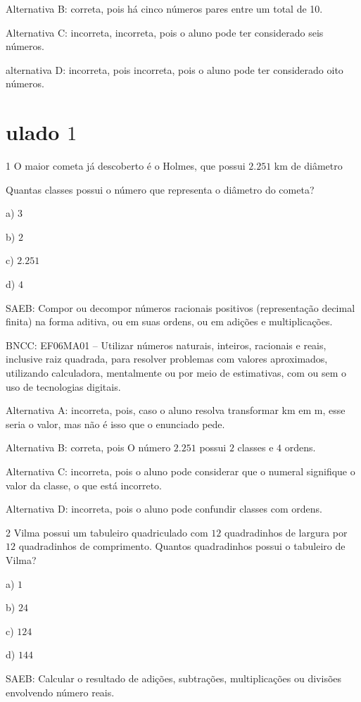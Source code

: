 Alternativa B: correta, pois há cinco números pares entre um total de
10.

Alternativa C: incorreta, incorreta, pois o aluno pode ter considerado
seis números.

alternativa D: incorreta, pois incorreta, pois o aluno pode ter
considerado oito números.

\chapter{ulado $1$}

\num{1}  O maior cometa já descoberto é o Holmes, que possui $2.251$ km de
diâmetro

Quantas classes possui o número que representa o diâmetro do cometa?

a) $3$

b) $2$

c) $2.251$

d) $4$

SAEB: Compor ou decompor números racionais positivos (representação
decimal finita) na forma aditiva, ou em suas ordens, ou em adições e
multiplicações.

BNCC: EF06MA01 -- Utilizar números naturais, inteiros, racionais e
reais, inclusive raiz quadrada, para resolver problemas com valores
aproximados, utilizando calculadora, mentalmente ou por meio de
estimativas, com ou sem o uso de tecnologias digitais.

Alternativa A: incorreta, pois, caso o aluno resolva transformar km em
m, esse seria o valor, mas não é isso que o enunciado pede.

Alternativa B: correta, pois O número $2.251$ possui $2$ classes e $4$ ordens.

Alternativa C: incorreta, pois o aluno pode considerar que o numeral
signifique o valor da classe, o que está incorreto.

Alternativa D: incorreta, pois o aluno pode confundir classes com
ordens.

\num{2}  Vilma possui um tabuleiro quadriculado com $12$ quadradinhos de largura
por $12$ quadradinhos de comprimento. Quantos quadradinhos possui o
tabuleiro de Vilma?

a) $1$

b) $24$

c) $124$

d) $144$

SAEB: Calcular o resultado de adições, subtrações, multiplicações ou
divisões envolvendo número reais.

